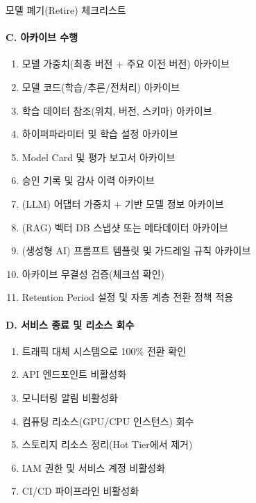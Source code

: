 \begin{practicaltool}{모델 폐기(Retire) 체크리스트}
\paragraph{C. 아카이브 수행}
\begin{enumerate}
 \item[$\square$] 모델 가중치(최종 버전 + 주요 이전 버전) 아카이브
 \item[$\square$] 모델 코드(학습/추론/전처리) 아카이브
 \item[$\square$] 학습 데이터 참조(위치, 버전, 스키마) 아카이브
 \item[$\square$] 하이퍼파라미터 및 학습 설정 아카이브
 \item[$\square$] Model Card 및 평가 보고서 아카이브
 \item[$\square$] 승인 기록 및 감사 이력 아카이브
 \item[$\square$] (LLM) 어댑터 가중치 + 기반 모델 정보 아카이브
 \item[$\square$] (RAG) 벡터 DB 스냅샷 또는 메타데이터 아카이브
 \item[$\square$] (생성형 AI) 프롬프트 템플릿 및 가드레일 규칙 아카이브
 \item[$\square$] 아카이브 무결성 검증(체크섬 확인)
 \item[$\square$] Retention Period 설정 및 자동 계층 전환 정책 적용
\end{enumerate}

\paragraph{D. 서비스 종료 및 리소스 회수}
\begin{enumerate}
 \item[$\square$] 트래픽 대체 시스템으로 100\% 전환 확인
 \item[$\square$] API 엔드포인트 비활성화
 \item[$\square$] 모니터링 알림 비활성화
 \item[$\square$] 컴퓨팅 리소스(GPU/CPU 인스턴스) 회수
 \item[$\square$] 스토리지 리소스 정리(Hot Tier에서 제거)
 \item[$\square$] IAM 권한 및 서비스 계정 비활성화
 \item[$\square$] CI/CD 파이프라인 비활성화
\end{enumerate}


\end{practicaltool}
